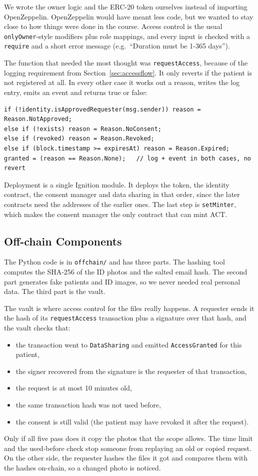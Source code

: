 \documentclass[10pt,a4paper]{article}
\begin{document}
We wrote the owner logic and the ERC-20 token ourselves instead of importing OpenZeppelin. OpenZeppelin would have meant less code, but we wanted to stay close to how things were done in the course. Access control is the usual \texttt{onlyOwner}-style modifiers plus role mappings, and every input is checked with a \texttt{require} and a short error message (e.g.\ ``Duration must be 1-365 days'').

The function that needed the most thought was \texttt{requestAccess}, because of the logging requirement from Section~\ref{sec:accessflow}. It only reverts if the patient is not registered at all. In every other case it works out a reason, writes the log entry, emits an event and returns true or false:

\begin{lstlisting}
if (!identity.isApprovedRequester(msg.sender)) reason = Reason.NotApproved;
else if (!exists) reason = Reason.NoConsent;
else if (revoked) reason = Reason.Revoked;
else if (block.timestamp >= expiresAt) reason = Reason.Expired;
granted = (reason == Reason.None);   // log + event in both cases, no revert
\end{lstlisting}

Deployment is a single Ignition module. It deploys the token, the identity contract, the consent manager and data sharing in that order, since the later contracts need the addresses of the earlier ones. The last step is \texttt{setMinter}, which makes the consent manager the only contract that can mint ACT.

\subsection{Off-chain Components}
\label{sec:offchain}

The Python code is in \texttt{offchain/} and has three parts. The hashing tool computes the SHA-256 of the ID photos and the salted email hash. The second part generates fake patients and ID images, so we never needed real personal data. The third part is the vault.

The vault is where access control for the files really happens. A requester sends it the hash of its \texttt{requestAccess} transaction plus a signature over that hash, and the vault checks that:
\begin{itemize}
  \item the transaction went to \texttt{DataSharing} and emitted \texttt{AccessGranted} for this patient,
  \item the signer recovered from the signature is the requester of that transaction,
  \item the request is at most 10 minutes old,
  \item the same transaction hash was not used before,
  \item the consent is still valid (the patient may have revoked it after the request).
\end{itemize}
Only if all five pass does it copy the photos that the scope allows. The time limit and the used-before check stop someone from replaying an old or copied request. On the other side, the requester hashes the files it got and compares them with the hashes on-chain, so a changed photo is noticed.
\end{document}

